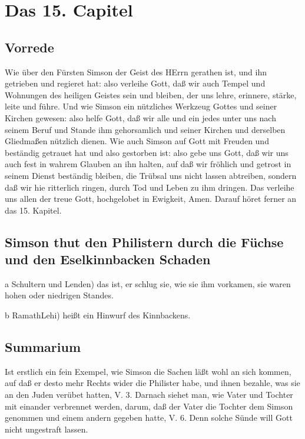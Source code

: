 \chapter{Das 15. Capitel}

\section{Vorrede}

Wie über den Fürsten Simson der Geist des HErrn gerathen ist, und ihn getrieben und regieret hat: also verleihe Gott, daß wir auch Tempel und Wohnungen des heiligen Geistes sein und bleiben, der uns lehre, erinnere, stärke, leite und führe. Und wie Simson ein nützliches Werkzeug Gottes und seiner Kirchen gewesen: also helfe Gott, daß wir alle und ein jedes unter uns nach seinem Beruf und Stande ihm gehorsamlich und seiner Kirchen und derselben Gliedmaßen nützlich dienen. Wie auch Simson auf Gott mit Freuden und beständig getrauet hat und also gestorben ist: also gebe uns Gott, daß
wir uns auch fest in wahrem Glauben an ihn halten, auf daß wir fröhlich und getrost in seinem Dienst beständig bleiben, die Trübsal uns nicht lassen abtreiben, sondern daß wir hie ritterlich ringen, durch Tod und Leben zu ihm dringen. Das verleihe uns allen der treue Gott, hochgelobet in Ewigkeit, Amen. Darauf höret ferner an das 15. Kapitel.

\section[Simson thut den Philistern durch die Füchse und]{Simson thut den Philistern durch die Füchse und den Eselkinnbacken Schaden}

a Schultern und Lenden) das ist, er schlug sie, wie sie ihm vorkamen, sie waren hohen oder niedrigen Standes.

b RamathLehi) heißt ein Hinwurf des Kinnbackens.

\section{Summarium}

Ist erstlich ein fein Exempel, wie Simson die Sachen läßt wohl an sich kommen, auf daß er desto mehr Rechts wider die Philister habe, und ihnen bezahle, was sie an den Juden verübet hatten, V. 3. Darnach siehet man, wie Vater und Tochter mit einander verbrennet werden, darum, daß der Vater die Tochter dem Simson genommen und einem andern gegeben
hatte, V. 6. Denn solche Sünde will Gott nicht ungestraft lassen.

